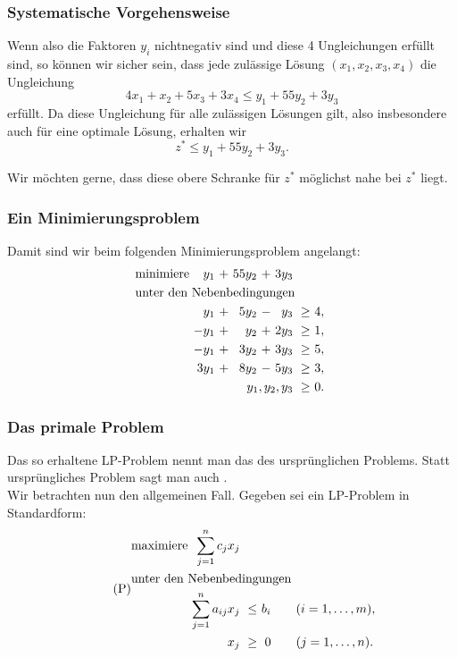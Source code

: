 \documentclass[smaller]{beamer}
\begin{document}
\begin{frame}
\frametitle{Systematische Vorgehensweise}
 Wenn also die Faktoren $y_i$ nichtnegativ sind und diese 4 Ungleichungen erfüllt sind, so können wir sicher sein, dass jede zulässige Lösung $(x_1,x_2,x_3,x_4)$ die Ungleichung
\[
4x_1 + x_2 + 5x_3 + 3x_4 \leq y_1 + 55y_2 + 3y_3
\]
erfüllt. Da diese Ungleichung für alle zulässigen Lösungen gilt, also insbesondere auch für eine optimale Lösung, erhalten wir
\[
z^* \leq y_1 + 55y_2 + 3y_3.
\]

Wir möchten gerne, dass diese obere Schranke für $z^*$ \alert{möglichst nahe bei $z^*$ liegt}.
\end{frame}

\begin{frame}
\frametitle{Ein Minimierungsproblem}
 Damit sind wir beim folgenden \alert{Minimierungsproblem} angelangt:
\begin{align*}
\begin{alignedat}{5}
& \text{minimiere } & y_1 &\ + &\ 55y_2 &\ + &\ 3y_3 & & \\
& \rlap{unter den Nebenbedingungen} & & & & & & & \\
&&  y_1 &\ + &\ 5y_2 &\ - &\  y_3 &\ \geq &\ 4,\ \\
&& -y_1 &\ + &\  y_2 &\ + &\ 2y_3 &\ \geq &\ 1,\ \\
&& -y_1 &\ + &\ 3y_2 &\ + &\ 3y_3 &\ \geq &\ 5,\ \\
&& 3y_1 &\ + &\ 8y_2 &\ - &\ 5y_3 &\ \geq &\ 3,\ \\
&& & & & & \llap{$y_1,y_2,y_3$} &\ \geq &\ 0. \
\end{alignedat}
\end{align*}
\end{frame}

\begin{frame}
\frametitle{Das primale Problem}
 Das so erhaltene LP-Problem nennt man das  des ursprünglichen Problems. Statt {\glqq}ursprüngliches Problem{\grqq} sagt man auch . \\ \vspace*{0.2cm}
 Wir betrachten nun den allgemeinen Fall. Gegeben sei ein LP-Problem in Standardform:
\begin{align}
\tag{P}
\begin{alignedat}{4}
& \text{maximiere } & \sum\limits_{j=1}^{n}{c_jx_j} & & & \\
& \rlap{unter den Nebenbedingungen} & & & & \\
&& \sum\limits_{j=1}^{n}{a_{ij}x_j} &\ \leq &\ b_i & \qquad (i=1,\ldots,m), \\
&&                              x_j &\ \geq &\   0 & \qquad (j=1,\ldots,n).
\end{alignedat}
\end{align}
\end{frame}
\end{document}
